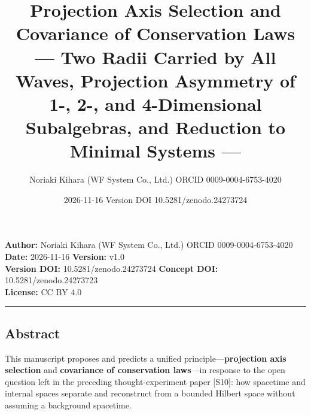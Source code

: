 \documentclass[
  a4paper,
]{article}
\title{Projection Axis Selection and Covariance of Conservation Laws ---
Two Radii Carried by All Waves, Projection Asymmetry of 1-, 2-, and
4-Dimensional Subalgebras, and Reduction to Minimal Systems ---}
\author{Noriaki Kihara (WF System Co., Ltd.) ORCID 0009-0004-6753-4020}
\date{2026-11-16 Version DOI 10.5281/zenodo.24273724}
\begin{document}
\maketitle

\textbf{Author:} Noriaki Kihara (WF System Co., Ltd.) ORCID
0009-0004-6753-4020\\
\textbf{Date:} 2026-11-16 \textbf{Version:} v1.0\\
\textbf{Version DOI:} 10.5281/zenodo.24273724 \textbf{Concept DOI:}
10.5281/zenodo.24273723\\
\textbf{License:} CC BY 4.0\\

\begin{center}\rule{0.5\linewidth}{0.5pt}\end{center}

\subsection{Abstract}\label{abstract}

This manuscript proposes and predicts a unified
principle---\textbf{projection axis selection} and \textbf{covariance of
conservation laws}---in response to the open question left in the
preceding thought-experiment paper {[}S10{]}: how spacetime and internal
spaces separate and reconstruct from a bounded Hilbert space without
assuming a background spacetime.
\end{document}
